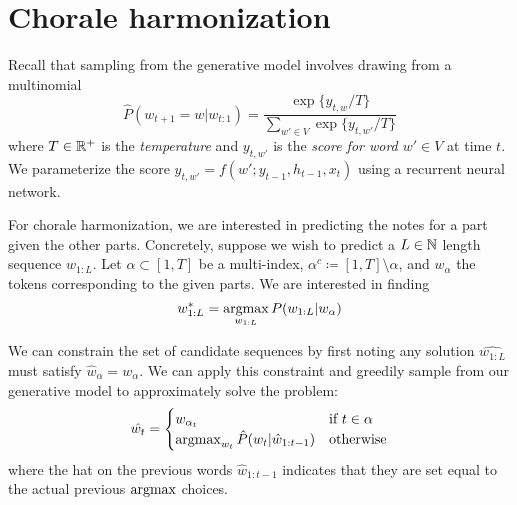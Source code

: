 \chapter{Chorale harmonization}

Recall that sampling from the generative model involves drawing from a multinomial
\[
  \hat{P}(w_{t+1} = w | w_{t:1}) = \frac{\exp \{ y_{t,w} / T \}}{\sum_{w' \in V} \exp \{ y_{t,w'} / T \}}
\]
where $T \in \mathbb{R}^+$ is the \emph{temperature} and $y_{t,w'}$ is the \emph{score for word $w' \in V$}
at time $t$. We parameterize the score $y_{t,w'} = f(w'; y_{t-1}, h_{t-1}, x_t)$ using a recurrent
neural network.


For chorale harmonization, we are interested in predicting the notes for a part
given the other parts. Concretely, suppose we wish to predict a $L \in \mathbb{N}$
length sequence $w_{1:L}$. Let $\alpha \subset [1,T]$ be a multi-index,
$\alpha^c \coloneqq [1,T] \setminus \alpha$, and $w_\alpha$ the tokens
corresponding to the given parts. We are interested in finding
\begin{equation}
  w_{1:L}^* = \operatorname*{argmax}_{w_{1:L}} P(w_{1:L} | w_{\alpha})
\end{equation}

We can constrain the set of candidate sequences by first noting any solution
$\hat{w_{1:L}}$ must satisfy $\hat{w}_\alpha = w_\alpha$. We can apply this
constraint and greedily sample from our generative model to approximately solve
the problem:
\begin{equation}
  \hat{w_{t}} = \begin{cases}
    w_{\alpha_t} &\mbox{if}~t \in \alpha \\
    \operatorname*{argmax}_{w_t} \hat{P}(w_t | \hat{w}_{1:t-1}) &\mbox{otherwise}
  \end{cases}
\end{equation}
where the hat on the previous words $\hat{w}_{1:t-1}$ indicates that they are
set equal to the actual previous $\operatorname*{argmax}$ choices.

